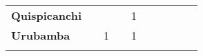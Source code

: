 \begin{tabular}{lccccccccc}
	\textbf{Quispicanchi}                       
	&\cellcolor[HTML]{FCC46C}			  		&\cellcolor[HTML]{FCC46C}        &\cellcolor[HTML]{FCC46C}                   &1                   
	&\cellcolor[HTML]{FCC46C}                   &\cellcolor[HTML]{FCC46C}                  
	&\cellcolor[HTML]{FCC46C}                   &\cellcolor[HTML]{FCC46C} 		 &\cellcolor[HTML]{FCC46C}\\
	\textbf{Urubamba}                           
	&\cellcolor[HTML]{FCC46C}                   &1        
	&\cellcolor[HTML]{FCC46C}                   &1                   
	&\cellcolor[HTML]{FCC46C}                   &\cellcolor[HTML]{FCC46C}                     &\cellcolor[HTML]{FCC46C}                   &\cellcolor[HTML]{FCC46C} 		 &\cellcolor[HTML]{FCC46C}\\
	&\multicolumn{1}{l}{}                       &\multicolumn{1}{l}{}            &\multicolumn{1}{l}{}                         
	&\multicolumn{1}{l}{}                       &\multicolumn{1}{l}{}            &\multicolumn{1}{l}{}                       &\multicolumn{1}{l}{}                       &\multicolumn{1}{l}{}            &\multicolumn{1}{l}{}    
\end{tabular}